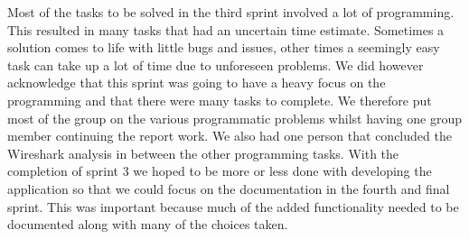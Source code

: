 Most of the tasks to be solved in the third sprint involved a lot of programming. This resulted in many tasks that had an uncertain time estimate. Sometimes a solution comes to life with little bugs and issues, other times a seemingly easy task can take up a lot of time due to unforeseen problems. We did however acknowledge that this sprint was going to have a heavy focus on the programming and that there were many tasks to complete. We therefore put most of the group on the various programmatic problems whilst having one group member continuing the report work. We also had one person that concluded the Wireshark analysis in between the other programming tasks. 
\newline
\newline
With the completion of sprint 3 we hoped to be more or less done with developing the application so that we could focus on the documentation in the fourth and final sprint. This was important because much of the added functionality needed to be documented along with many of the choices taken.